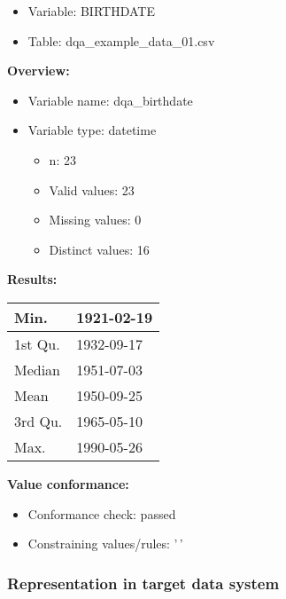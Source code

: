 \documentclass[
]{article}
\providecommand{\tightlist}{%
  \setlength{\itemsep}{0pt}\setlength{\parskip}{0pt}}
\begin{document}
\begin{itemize}
\tightlist
\item
  Variable: BIRTHDATE
\item
  Table: dqa\_example\_data\_01.csv
\end{itemize}

\textbf{Overview:}

\begin{itemize}
\tightlist
\item
  Variable name: dqa\_birthdate
\item
  Variable type: datetime

  \begin{itemize}
  \tightlist
  \item
    n: 23
  \item
    Valid values: 23
  \item
    Missing values: 0
  \item
    Distinct values: 16
  \end{itemize}
\end{itemize}

\textbf{Results:}\\

\begin{table}[H]
\centering
\begin{tabular}{l|l}
\hline
Min. & 1921-02-19\\
\hline
1st Qu. & 1932-09-17\\
\hline
Median & 1951-07-03\\
\hline
Mean & 1950-09-25\\
\hline
3rd Qu. & 1965-05-10\\
\hline
Max. & 1990-05-26\\
\hline
\end{tabular}
\end{table}

\textbf{Value conformance:}

\begin{itemize}
\tightlist
\item
  Conformance check: passed
\item
  Constraining values/rules: '\,'
\end{itemize}

\newpage

\hypertarget{representation-in-target-data-system-2}{%
\subsubsection{\texorpdfstring{Representation in \textbf{target} data
system}{Representation in target data system}}\label{representation-in-target-data-system-2}}
\end{document}

